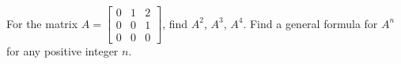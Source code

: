 For the matrix 
$A = \begin{bmatrix} 0 & 1 & 2 \\ 0 & 0 & 1 \\ 0 & 0 & 0 \end{bmatrix}$, 
find $A^2$, $A^3$, $A^4$.  Find a general formula for $A^n$ for any positive integer $n$.
